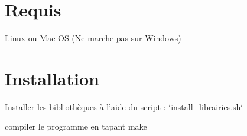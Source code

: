 \section*{Requis}


\begin{DoxyItemize}
\item Linux ou Mac O\+S (Ne marche pas sur Windows)
\end{DoxyItemize}

\section*{Installation}


\begin{DoxyItemize}
\item Installer les bibliothèques à l'aide du script \+: \char`\"{}install\+\_\+librairies.\+sh\char`\"{}
\end{DoxyItemize}

compiler le programme en tapant make 